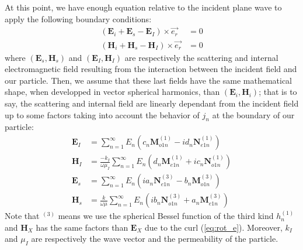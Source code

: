 \documentclass{article}
\begin{document}
At this point, we have enough equation relative to the incident plane wave to apply the following boundary conditions:
\begin{align}\label{eq:boundaries}
(\textbf{E}_{i} + \textbf{E}_{s} - \textbf{E}_{I}) \times \overrightarrow{e_{r}} &= 0\\
(\textbf{H}_{i} + \textbf{H}_{s} - \textbf{H}_{I}) \times \overrightarrow{e_{r}} &= 0
\end{align}
where $(\textbf{E}_{s}, \textbf{H}_{s})$ and $(\textbf{E}_{I}, \textbf{H}_{I})$ are respectively the scattering and internal electromagnetic field resulting from the interaction between the incident field and our particle. Then, we assume that these last fields have the same mathematical shape, when developped in vector spherical harmonics, than $(\textbf{E}_{i}, \textbf{H}_{i})$; that is to say, the scattering and internal field are linearly dependant from the incident field up to some factors taking into account the behavior of $j_{n}$ at the boundary of our particle:
\begin{align}
\textbf{E}_{I}&=\sum_{n=1}^{\infty }E_{n}(c_{n}\textbf{M}^{(1)}_{o1n} - id_{n}\textbf{N}^{(1)}_{e1n})\\
\textbf{H}_{I}&=\frac{-k_{I}}{\omega\mu_{I}}\sum_{n=1}^{\infty }E_{n}(d_{n}\textbf{M}^{(1)}_{e1n} + ic_{n}\textbf{N}^{(1)}_{o1n})\\
\textbf{E}_{s}&=\sum_{n=1}^{\infty }E_{n}(ia_{n}\textbf{N}^{(3)}_{e1n} - b_{n}\textbf{M}^{(3)}_{o1n})\\
\textbf{H}_{s}&=\frac{k}{\omega\mu}\sum_{n=1}^{\infty }E_{n}(ib_{n}\textbf{N}^{(3)}_{o1n} + a_{n}\textbf{M}^{(3)}_{e1n})
\end{align}
Note that $^{(3)}$ means we use the spherical Bessel function of the third kind $h^{(1)}_{n}$ and $\textbf{H}_{X}$ has the same factors than $\textbf{E}_{X}$ due to the curl (\ref{eq:rot_e}). Moreover, $k_{I}$ and $\mu_{I}$ are respectively the wave vector and the permeability of the particle.
\end{document}
